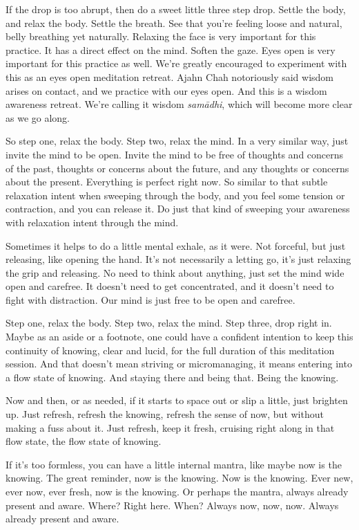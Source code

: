 \documentclass[12pt,openany]{book}
\begin{document}
If the drop is too abrupt, then do a sweet little three step drop. Settle the body, and relax the body. Settle the breath. See that you're feeling loose and natural, belly breathing yet  naturally. Relaxing the face is very important for this practice. It has a direct effect on the mind. Soften the gaze. Eyes open is very important for this practice as well. We're greatly encouraged to experiment with this as an eyes open meditation retreat. Ajahn Chah notoriously said wisdom arises on contact, and we practice with our eyes open. And this is a wisdom awareness retreat. We’re calling it wisdom \textit{samādhi}, which will become more clear as we go along.

So step one, relax the body. Step two, relax the mind. In a very similar way, just invite the mind  to be open. Invite the mind to be free of thoughts and concerns of the past, thoughts or concerns about the future, and any thoughts or concerns about the present. Everything is perfect right now. So similar to that subtle relaxation intent when sweeping through the body, and you feel some tension or contraction, and you can release it. Do just that kind of sweeping your awareness with relaxation intent through the mind. 

Sometimes it helps to do a little mental exhale, as it were. Not forceful, but just releasing, like opening the hand. It's not necessarily a letting go, it’s just relaxing the grip and releasing. No need to think about anything, just set the mind wide open and carefree. It doesn’t need to get concentrated, and it doesn’t need to fight with distraction. Our mind is just free to be open and carefree. 

Step one, relax the body. Step two, relax the mind. Step three, drop right in. Maybe as an aside or a footnote, one could have a confident intention to keep this continuity of knowing, clear and lucid, for the full duration of this meditation session. And that doesn't mean striving or micromanaging, it means entering into a flow state of knowing. And staying there and being that. Being the knowing.

Now and then, or as needed, if it starts to space out or slip a little, just brighten up. Just refresh, refresh the knowing, refresh the sense of now, but without making a fuss about it. Just refresh, keep it fresh, cruising right along in that flow state, the flow state of knowing.

If it's too formless, you can have a little internal mantra, like maybe now is the knowing. The great reminder, now is the knowing. Now is the knowing. Ever new, ever now, ever fresh, now is the knowing. Or perhaps the mantra, always already present and aware. Where? Right here. When? Always now, now, now. Always already present and aware.
\end{document}
